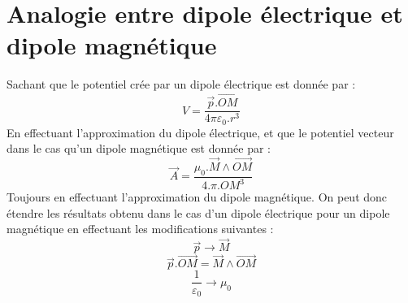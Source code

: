 \section{Analogie entre dipole électrique et dipole magnétique}
Sachant que le potentiel crée par un dipole électrique est donnée par :
$$V = \dfrac{\overrightarrow{p}.\overrightarrow{OM}}{4\pi\varepsilon_0.r^3}$$
En effectuant l'approximation du dipole électrique, et que le potentiel vecteur dans le cas qu'un dipole magnétique est donnée par :
$$\overrightarrow{A} = \dfrac{\mu_0.\overrightarrow{M}\wedge\overrightarrow{OM}}{4.\pi.OM^3}$$
Toujours en effectuant l'approximation du dipole magnétique. On peut donc étendre les résultats obtenu dans le cas d'un dipole électrique pour un dipole magnétique en effectuant les modifications suivantes :
$$\overrightarrow{p} \rightarrow \overrightarrow{M}$$
$$\overrightarrow{p}.\overrightarrow{OM} = \overrightarrow{M}\wedge\overrightarrow{OM}$$
$$\dfrac{1}{\varepsilon_0} \rightarrow \mu_0$$
